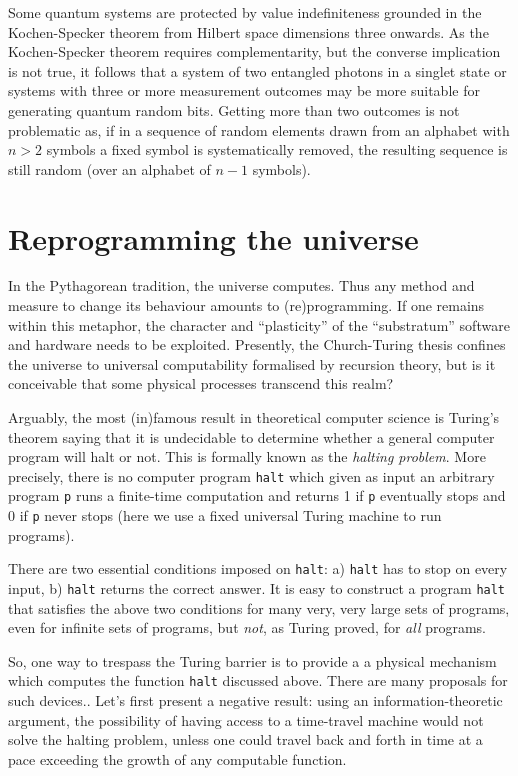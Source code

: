 \documentclass[11pt, pra,amsfonts,showpacs,showkeys]{revtex4}%
\begin{document}
Some quantum systems are protected by value indefiniteness grounded in the Kochen-Specker theorem
from Hilbert space dimensions three onwards.
As
the Kochen-Specker theorem requires complementarity, but the converse implication is not true, it follows that
 a system of two entangled photons in a singlet state
or systems with three or more
measurement outcomes may be more suitable for generating quantum random bits.
Getting more than two outcomes is not problematic as, if in a sequence of random elements drawn from an alphabet with $n>2$ symbols
 a fixed symbol is systematically removed, the resulting sequence is still random (over an alphabet of $n-1$
 symbols).



\section{Reprogramming the universe}

In the Pythagorean tradition, the universe computes.
Thus any method and measure to change its behaviour amounts to (re)programming.
If one remains within this metaphor, the character and ``plasticity'' of the ``substratum'' software and hardware needs to be exploited.
Presently, the Church-Turing thesis confines the universe to universal computability formalised by
recursion theory,
but is it conceivable that some physical processes transcend this realm?

Arguably, the most (in)famous  result in theoretical computer science is  Turing's
theorem saying that it is undecidable to determine whether a
general
computer program will halt or not.   This is formally known as the \emph{%
halting problem}.  More precisely, there is no computer program {\tt halt}
which given as input an arbitrary program {\tt p} runs a finite-time computation and returns 1 if
{\tt p} eventually stops and 0 if {\tt p} never stops (here we use a fixed universal Turing machine
to run programs).

There are two essential conditions imposed on {\tt halt}: a) {\tt halt} has to stop on every input, b)
{\tt halt} returns the correct answer.
It is easy to construct a program {\tt halt} that satisfies the above two
conditions for many very, very large sets of programs, even for infinite sets of programs,
but {\it not}, as Turing proved, for {\it all} programs.



So, one way to trespass the Turing barrier is to provide a
a physical mechanism which computes the function  {\tt halt} discussed above. There are many
proposals for such devices..
Let's first present a negative result:  using an information-theoretic
argument,  the possibility of having access to a time-travel machine
 would not solve the halting problem,
unless one
could travel back and forth in time at a pace exceeding the growth of any
computable function.
\end{document}
